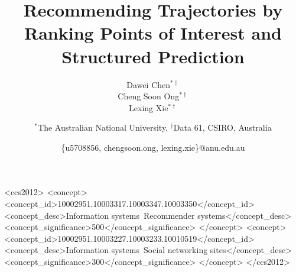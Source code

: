 \documentclass{sig-alternate-05-2015}
\begin{document}

\title{Recommending Trajectories by Ranking Points of Interest and Structured Prediction}

\author{
    \alignauthor Dawei Chen$^{*\dagger}$\\
    \alignauthor Cheng Soon Ong$^{*\dagger}$\\
    \alignauthor Lexing Xie$^{*\dagger}$\\
    \and
    $^*$The Australian National University, $^\dagger$Data 61, CSIRO, Australia\\
    \and
    \{u5708856, chengsoon.ong, lexing.xie\}@anu.edu.au
}

\maketitle

\begin{abstract}

\end{abstract}

\begin{CCSXML}
    <ccs2012>
    <concept>
    <concept_id>10002951.10003317.10003347.10003350</concept_id>
    <concept_desc>Information systems~Recommender systems</concept_desc>
    <concept_significance>500</concept_significance>
    </concept>
    <concept>
    <concept_id>10002951.10003227.10003233.10010519</concept_id>
    <concept_desc>Information systems~Social networking sites</concept_desc>
    <concept_significance>300</concept_significance>
    </concept>
    </ccs2012>
\end{CCSXML}
\printccsdesc



%


%





\end{document}
